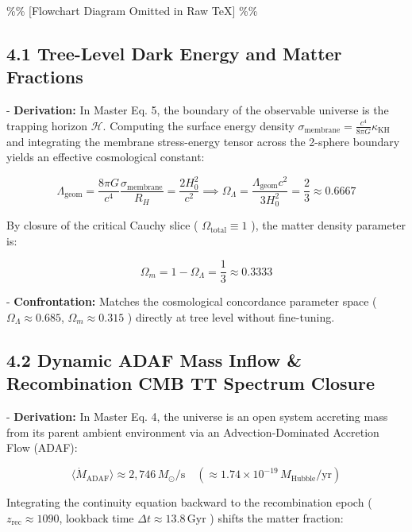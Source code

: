 \documentclass[11pt,a4paper]{article}
\theoremstyle{definition}
\theoremstyle{remark}
\begin{document}
\%\% [Flowchart Diagram Omitted in Raw TeX] \%\%

\subsection{4.1 Tree-Level Dark Energy and Matter Fractions}
- \textbf{Derivation:} In Master Eq. 5, the boundary of the observable universe is the trapping horizon $\mathcal{H}$. Computing the surface energy density $\sigma_{\text{membrane}} = \frac{c^4}{8\pi G} \kappa_{\text{KH}}$ and integrating the membrane stress-energy tensor across the 2-sphere boundary yields an effective cosmological constant:


\begin{equation}
\Lambda_{\text{geom}} = \frac{8\pi G}{c^4} \frac{\sigma_{\text{membrane}}}{R_H} = \frac{2 H_0^2}{c^2} \implies \Omega_\Lambda = \frac{\Lambda_{\text{geom}} c^2}{3 H_0^2} = \frac{2}{3} \approx 0.6667
\end{equation}


  By closure of the critical Cauchy slice ( $\Omega_{\text{total}} \equiv 1$ ), the matter density parameter is:


\begin{equation}
\Omega_m = 1 - \Omega_\Lambda = \frac{1}{3} \approx 0.3333
\end{equation}


- \textbf{Confrontation:} Matches the cosmological concordance parameter space ( $\Omega_\Lambda \approx 0.685$, $\Omega_m \approx 0.315$ ) directly at tree level without fine-tuning.

\subsection{4.2 Dynamic ADAF Mass Inflow \& Recombination CMB TT Spectrum Closure}
- \textbf{Derivation:} In Master Eq. 4, the universe is an open system accreting mass from its parent ambient environment via an Advection-Dominated Accretion Flow (ADAF):


\begin{equation}
\langle \dot{M}_{\text{ADAF}} \rangle \approx 2{,}746 \, M_\odot/\text{s} \quad (\approx 1.74 \times 10^{-19} \, M_{\text{Hubble}}/\text{yr})
\end{equation}


  Integrating the continuity equation backward to the recombination epoch ( $z_{\text{rec}} \approx 1090$, lookback time $\Delta t \approx 13.8 \, \mathrm{Gyr}$ ) shifts the matter fraction:
\end{document}
